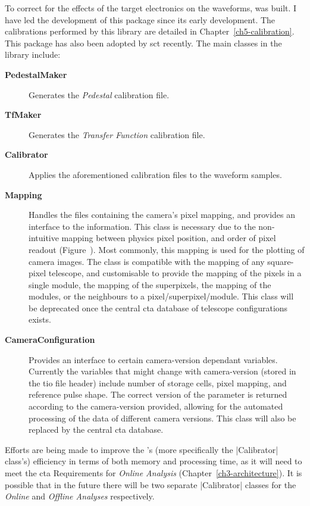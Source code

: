 To correct for the effects of the \gls{target} electronics on the waveforms,  was built. I have led the development of this package since its early development. The calibrations performed by this library are detailed in Chapter~\ref{ch5-calibration}. This package has also been adopted by \gls{sct} recently. The main classes in the library include:

\lstset{language=C++}
\begin{description}
\item [\textbf{PedestalMaker}] Generates the \textit{Pedestal} calibration file.
\item [\textbf{TfMaker}] Generates the \textit{Transfer Function} calibration file.
\item [\textbf{Calibrator}] Applies the aforementioned calibration files to the waveform samples.
\item [\textbf{Mapping}] Handles the files containing the camera's pixel mapping, and provides an interface to the information. This class is necessary due to the non-intuitive mapping between physics pixel position, and order of pixel readout (Figure~). Most commonly, this mapping is used for the plotting of camera images. The class is compatible with the mapping of any square-pixel telescope, and customisable to provide the mapping of the pixels in a single module, the mapping of the superpixels, the mapping of the modules, or the neighbours to a pixel/superpixel/module. This class will be deprecated once the central \gls{cta} database of telescope configurations exists.
\item [\textbf{CameraConfiguration}] Provides an interface to certain camera-version dependant variables. Currently the variables that might change with camera-version (stored in the \gls{tio} file header) include number of storage cells, pixel mapping, and reference pulse shape. The correct version of the parameter is returned according to the camera-version provided, allowing for the automated processing of the data of different camera versions. This class will also be replaced by the central \gls{cta} database.
\end{description}

Efforts are being made to improve the 's (more specifically the |Calibrator| class's) efficiency in terms of both memory and processing time, as it will need to meet the \gls{cta} Requirements for \textit{Online Analysis} (Chapter~\ref{ch3-architecture}). It is possible that in the future there will be two separate |Calibrator| classes for the \textit{Online} and \textit{Offline Analyses} respectively.

